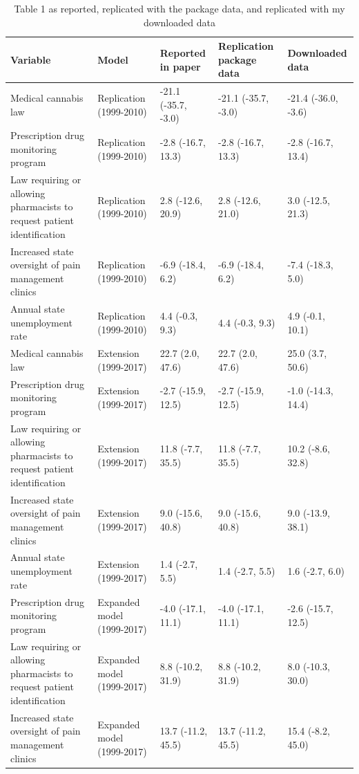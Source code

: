 \begin{table}

\caption{Table 1 as reported, replicated with the package data, and replicated with my downloaded data}
\centering
\begin{tabular}[t]{lllll}
\toprule
Variable & Model & Reported in paper & Replication package data & Downloaded data\\
\midrule
Medical cannabis law & Replication (1999-2010) & -21.1 (-35.7, -3.0) & -21.1 (-35.7, -3.0) & -21.4 (-36.0, -3.6)\\
Prescription drug monitoring program & Replication (1999-2010) & -2.8 (-16.7, 13.3) & -2.8 (-16.7, 13.3) & -2.8 (-16.7, 13.4)\\
Law requiring or allowing pharmacists to request patient identification & Replication (1999-2010) & 2.8 (-12.6, 20.9) & 2.8 (-12.6, 21.0) & 3.0 (-12.5, 21.3)\\
Increased state oversight of pain management clinics & Replication (1999-2010) & -6.9 (-18.4, 6.2) & -6.9 (-18.4, 6.2) & -7.4 (-18.3, 5.0)\\
Annual state unemployment rate & Replication (1999-2010) & 4.4 (-0.3, 9.3) & 4.4 (-0.3, 9.3) & 4.9 (-0.1, 10.1)\\
\addlinespace
Medical cannabis law & Extension (1999-2017) & 22.7 (2.0, 47.6) & 22.7 (2.0, 47.6) & 25.0 (3.7, 50.6)\\
Prescription drug monitoring program & Extension (1999-2017) & -2.7 (-15.9, 12.5) & -2.7 (-15.9, 12.5) & -1.0 (-14.3, 14.4)\\
Law requiring or allowing pharmacists to request patient identification & Extension (1999-2017) & 11.8 (-7.7, 35.5) & 11.8 (-7.7, 35.5) & 10.2 (-8.6, 32.8)\\
Increased state oversight of pain management clinics & Extension (1999-2017) & 9.0 (-15.6, 40.8) & 9.0 (-15.6, 40.8) & 9.0 (-13.9, 38.1)\\
Annual state unemployment rate & Extension (1999-2017) & 1.4 (-2.7, 5.5) & 1.4 (-2.7, 5.5) & 1.6 (-2.7, 6.0)\\
\addlinespace
Prescription drug monitoring program & Expanded model (1999-2017) & -4.0 (-17.1, 11.1) & -4.0 (-17.1, 11.1) & -2.6 (-15.7, 12.5)\\
Law requiring or allowing pharmacists to request patient identification & Expanded model (1999-2017) & 8.8 (-10.2, 31.9) & 8.8 (-10.2, 31.9) & 8.0 (-10.3, 30.0)\\
Increased state oversight of pain management clinics & Expanded model (1999-2017) & 13.7 (-11.2, 45.5) & 13.7 (-11.2, 45.5) & 15.4 (-8.2, 45.0)\\

\end{tabular}
\end{table}
